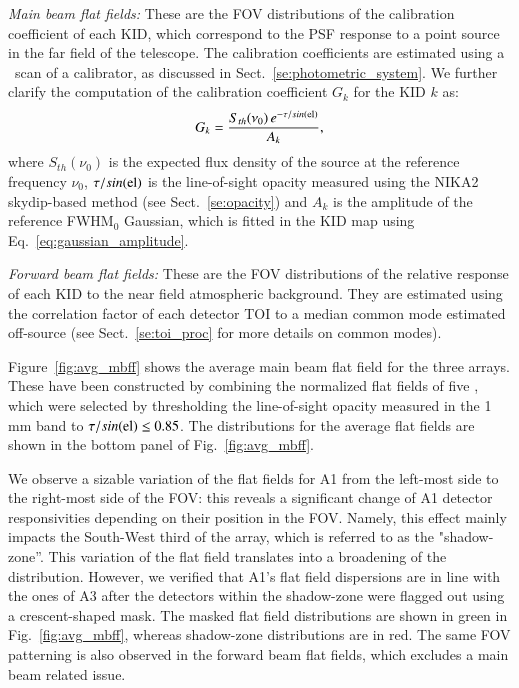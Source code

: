 \noindent \emph{Main beam flat fields:} These are the FOV distributions
of the calibration coefficient of each KID, which correspond to the
PSF response to a point source in the far field of the
telescope. The calibration coefficients are estimated using a \bm\ scan
of a calibrator, as discussed in Sect.~\ref{se:photometric_system}. We
further clarify the computation of the calibration coefficient $G_k$
for the KID $k$ as:
\begin{equation}
  G_k = \frac{S_{th}(\nu_0)\, e^{-\tau/sin(\rm{el})}}{A_k}, 
\end{equation}
where $S_{th}(\nu_0)$ is the expected flux density of the source at
the reference frequency $\nu_0$, $\tau/sin(\rm{el})$ is the
line-of-sight opacity measured using the NIKA2 skydip-based method
(see Sect.~\ref{se:opacity}) and $A_k$ is the
amplitude of the reference FWHM$_0$ Gaussian, which is fitted in the
KID map using Eq.~\ref{eq:gaussian_amplitude}.

\noindent \emph{Forward beam flat fields:} These are the FOV
distributions of the relative response of
each KID to the near field atmospheric background. They are estimated
using the correlation factor of each detector TOI 
to a median common mode estimated off-source (see Sect.~\ref{se:toi_proc} for
more details on common modes).

Figure~\ref{fig:avg_mbff} %
shows the average main beam %
flat field for the three arrays. These have been constructed by
combining the normalized flat fields of five \bms, which were
selected by thresholding the line-of-sight opacity measured in the
1\,mm band to $\tau/sin(\rm{el}) \leq 0.85$. The distributions for the average flat
fields are shown in the bottom panel of Fig.~\ref{fig:avg_mbff}.%

We observe a sizable variation of the flat fields for A1 from the left-most side
to the right-most side of the FOV: this reveals a significant change of A1
detector responsivities depending on their position in the FOV. Namely, this
effect mainly impacts the South-West third of the array, which is
referred to as the "shadow-zone''. This variation of the
flat field translates into a broadening of the distribution. However, we verified that A1's
flat field dispersions are in line with the ones of A3 after the
detectors within the shadow-zone were flagged out using a
crescent-shaped mask. The masked flat field distributions are shown in
green in Fig.~\ref{fig:avg_mbff}, %
whereas shadow-zone distributions are in red. The same FOV patterning
is also observed in the forward beam flat fields, which excludes a
main beam related issue. 


